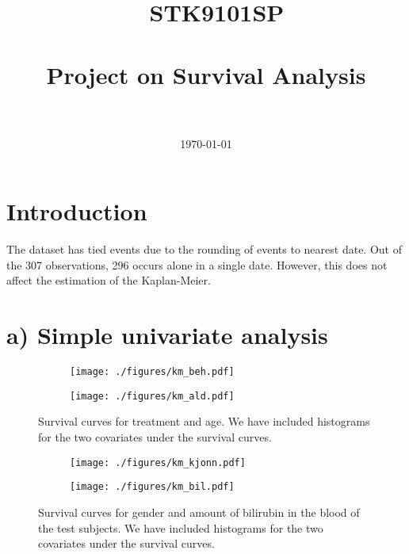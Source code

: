 \documentclass[11pt,a4paper]{article}
\title{\
\normalfont \normalsize 
\textsc{STK9101SP} \\ [25pt] %
\horrule{0.5pt} \\[0.4cm] %
\huge Project on Survival Analysis \\ %
\horrule{2pt} \\[0.5cm] %
}
\author{\AuthorName} %
\date{\normalsize\today} %
\begin{document}
\maketitle
%
\section{Introduction}

The dataset has tied events due to the rounding of events to nearest date. Out of the 307 observations, 296 occurs alone in a single date. However, this does not affect the estimation of the Kaplan-Meier.


\section{a) Simple univariate analysis}


\begin{figure}[h!tbp]
    \centering
    \begin{subfigure}[b]{0.48\textwidth}
        \texttt{[image: ./figures/km\_beh.pdf]}
    \end{subfigure}%
    \quad
    \begin{subfigure}[b]{0.48\textwidth}
        \texttt{[image: ./figures/km\_ald.pdf]}
    \end{subfigure}
    \vspace{1\baselineskip}
    \caption{Survival curves for treatment and age. We have included histograms for the two covariates under the survival curves.}
    \label{fig:alb}
\end{figure}

\begin{figure}[h!tbp]
    \centering
    \begin{subfigure}[b]{0.48\textwidth}
        \texttt{[image: ./figures/km\_kjonn.pdf]}
    \end{subfigure}%
    \quad
    \begin{subfigure}[b]{0.48\textwidth}
        \texttt{[image: ./figures/km\_bil.pdf]}
    \end{subfigure}
    \vspace{1\baselineskip}
    \caption{Survival curves for gender and amount of bilirubin in the blood of the test subjects. We have included histograms for the two covariates under the survival curves.}
    \label{fig:alb}
\end{figure}
\end{document}
